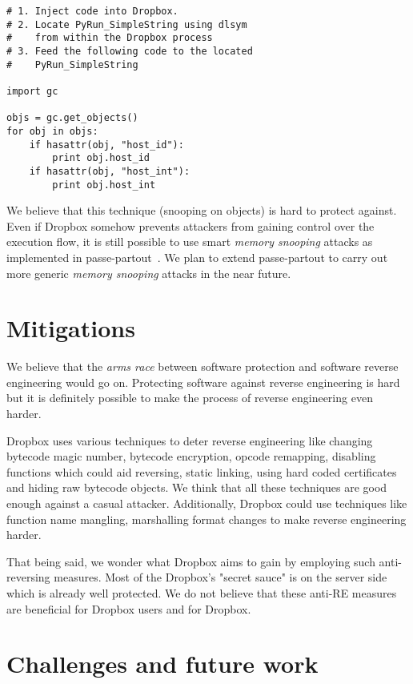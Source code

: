\documentclass[letterpaper,twocolumn,10pt]{article}
\begin{document}
\begin{verbatim}
# 1. Inject code into Dropbox.
# 2. Locate PyRun_SimpleString using dlsym
#    from within the Dropbox process
# 3. Feed the following code to the located
#    PyRun_SimpleString

import gc

objs = gc.get_objects()
for obj in objs:
    if hasattr(obj, "host_id"):
        print obj.host_id
    if hasattr(obj, "host_int"):
        print obj.host_int

\end{verbatim}

We believe that this technique (snooping on objects) is hard to protect
against. Even if Dropbox somehow prevents attackers from gaining control over
the execution flow, it is still possible to use smart \emph{memory snooping}
attacks as implemented in passe-partout~\cite{passe-partout}. We plan to extend
passe-partout to carry out more generic \emph{memory snooping} attacks in the
near future.

\section{Mitigations}

We believe that the \emph{arms race} between software protection and software
reverse engineering would go on. Protecting software against reverse
engineering is hard but it is definitely possible to make the process
of reverse engineering even harder.

Dropbox uses various techniques to deter reverse engineering like changing
bytecode magic number, bytecode encryption, opcode remapping, disabling
functions which could aid reversing, static linking, using hard coded
certificates and hiding raw bytecode objects. We think that all these
techniques are good enough against a casual attacker. Additionally, Dropbox
could use techniques like function name mangling, marshalling
format changes to make reverse engineering harder.

That being said, we wonder what Dropbox aims to gain by employing such
anti-reversing measures. Most of the Dropbox's "secret sauce" is on the
server side which is already well protected. We do not believe that these
anti-RE measures are beneficial for Dropbox users and for Dropbox.

\section{Challenges and future work}
\end{document}

